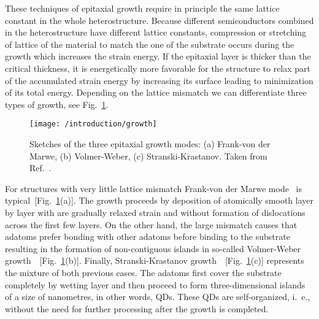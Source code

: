 \documentclass[
a4paper, %
11pt, %
onecolumn, %
openany, %
oldfontcommands,
]{memoir}
\begin{document}
These techniques of epitaxial growth require in principle the same lattice constant in the whole heterostructure. Because different semiconductors combined in the heterostructure have different lattice constants, compression or stretching of lattice of the material to match the one of the substrate occurs during the growth which increases the strain energy. %
% 
If the epitaxial layer is thicker than the critical thickness, it is energetically more favorable for the structure to relax part of the accumulated strain energy by increasing its surface leading to minimization of its total energy.
Depending on the lattice mismatch %
we can differentiate three types of growth, see Fig.~\ref{fig:intr:growth}.
%
\begin{figure}
	\centering
	\texttt{[image: /introduction/growth]}
	\caption{Sketches of the three epitaxial growth modes: (a) Frank-von der Marwe, (b) Volmer-Weber, (c) Stranski-Krastanov. Taken from Ref.~\cite{t_bonato}.}
	\label{fig:intr:growth}
\end{figure}
%

For structures with very little lattice mismatch Frank-von der Marwe mode~\cite{Frank-Merwe} is typical~[Fig.~\ref{fig:intr:growth}(a)]. The growth proceeds by deposition of atomically smooth layer by layer with are gradually relaxed strain and without formation of dislocations across the first few layers. On the other hand, the large mismatch causes that adatoms prefer bonding with other adatoms before binding to the substrate resulting in the formation of non-contiguous islands in so-called Volmer-Weber growth~\cite{Volmer-Weber}~[Fig.~\ref{fig:intr:growth}(b)]. Finally, Stranski-Krastanov growth~\cite{Stranski1937}~[Fig.~\ref{fig:intr:growth}(c)] represents the mixture of both previous cases. The adatoms first cover the substrate completely by wetting layer and then proceed to form three-dimensional islands of a size of nanometres, in other words, QDs. These QDs are self-organized, i.~e., without the need for further processing after the growth is completed.
\end{document}
